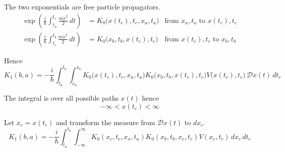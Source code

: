 The two exponentials are free particle propagators.
\begin{align*}
\exp\left(\frac{i}{\hbar}\int_{t_a}^{t_c}\frac{m\dot x^2}{2}\,dt\right)
&=K_0\bigl(x(t_c),t_c,x_a,t_a\bigr)
&\text{from $x_a,t_a$ to $x(t_c),t_c$}
\\
\exp\left(\frac{i}{\hbar}\int_{t_c}^{t_b}\frac{m\dot x^2}{2}\,dt\right)
&=K_0\bigl(x_b,t_b,x(t_c),t_c\bigr)
&\text{from $x(t_c),t_c$ to $x_b,t_b$}
\end{align*}

Hence
\begin{equation*}
K_1(b,a)=-\frac{i}{\hbar}\int_{t_a}^{t_b}\int_{x_a}^{x_b}
K_0\bigl(x(t_c),t_c,x_a,t_a\bigr)K_0\bigl(x_b,t_b,x(t_c),t_c\bigr)
V\bigl(x(t_c),t_c\bigr)
\,\mathscr Dx(t)\,dt_c
\end{equation*}

The integral is over all possible paths $x(t)$ hence
\begin{equation*}
-\infty<x(t_c)<\infty
\end{equation*}

Let $x_c=x(t_c)$ and transform the measure from $\mathscr Dx(t)$ to $dx_c$.
\begin{equation*}
K_1(b,a)=-\frac{i}{\hbar}\int_{t_a}^{t_b}\int_{-\infty}^\infty
K_0(x_c,t_c,x_a,t_a)K_0(x_b,t_b,x_c,t_c)
V(x_c,t_c)
\,dx_c\,dt_c
\end{equation*}


